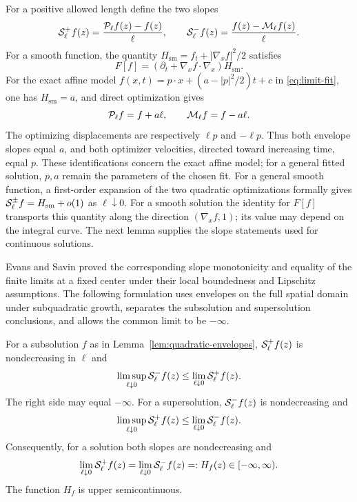 For a positive allowed length define the two slopes
\begin{equation}\label{eq:envelope-slopes}
  \mathcal{S}_\ell^+f(z)=\frac{\mathcal{P}_\ell f(z)-f(z)}{\ell},
  \qquad
  \mathcal{S}_\ell^-f(z)=\frac{f(z)-\mathcal{M}_\ell f(z)}{\ell}.
\end{equation}
For a smooth function, the quantity
$H_{\mathrm{sm}}=f_t+|\nabla_xf|^2/2$ satisfies
\[
  F[f]=(\partial_t+\nabla_xf\cdot\nabla_x)H_{\mathrm{sm}}.
\]
For the exact affine model
$f(x,t)=p\cdot x+(a-|p|^2/2)t+c$ in \eqref{eq:limit-fit}, one has
$H_{\mathrm{sm}}=a$, and direct optimization gives
\[
  \mathcal{P}_\ell f=f+a\ell,\qquad \mathcal{M}_\ell f=f-a\ell.
\]
The optimizing displacements are respectively $\ell p$ and $-\ell p$.
Thus both envelope slopes equal $a$, and both optimizer velocities,
directed toward increasing time, equal $p$. These identifications concern
the exact affine model; for a general fitted solution, $p,a$ remain the
parameters of the chosen fit. For a general smooth function, a first-order
expansion of the two quadratic optimizations formally gives
$\mathcal{S}_\ell^\pm f=H_{\mathrm{sm}}+o(1)$ as $\ell\downarrow0$.
For a smooth solution the identity for $F[f]$ transports this quantity along
the direction $(\nabla_xf,1)$; its value may depend on the integral curve.
The next lemma supplies the slope statements used for continuous solutions.

Evans and Savin \cite[Theorem~3.1]{EvansSavin2008} proved the corresponding
slope monotonicity and equality of the finite limits at a fixed center under
their local boundedness and Lipschitz assumptions. The following formulation
uses envelopes on the full spatial domain under subquadratic growth,
separates the subsolution and supersolution conclusions, and allows the common
limit to be $-\infty$.

\begin{lemma}\label{lem:envelope-slopes}
For a subsolution $f$ as in Lemma~\ref{lem:quadratic-envelopes},
$\mathcal{S}_\ell^+f(z)$ is nondecreasing in $\ell$ and
\begin{equation}\label{eq:subsolution-slope-order}
  \limsup_{\ell\downarrow0}\mathcal{S}_\ell^-f(z)
       \le\lim_{\ell\downarrow0}\mathcal{S}_\ell^+f(z).
\end{equation}
The right side may equal $-\infty$. For a supersolution,
$\mathcal{S}_\ell^-f(z)$ is nondecreasing and
\[
  \limsup_{\ell\downarrow0}\mathcal{S}_\ell^+f(z)
       \le\lim_{\ell\downarrow0}\mathcal{S}_\ell^-f(z).
\]
Consequently, for a
solution both slopes are nondecreasing and
\begin{equation}\label{eq:hamiltonian}
  \lim_{\ell\downarrow0}\mathcal{S}_\ell^+f(z)
  =\lim_{\ell\downarrow0}\mathcal{S}_\ell^-f(z)
  =:H_f(z)\in[-\infty,\infty).
\end{equation}
The function $H_f$ is upper semicontinuous.
\end{lemma}

